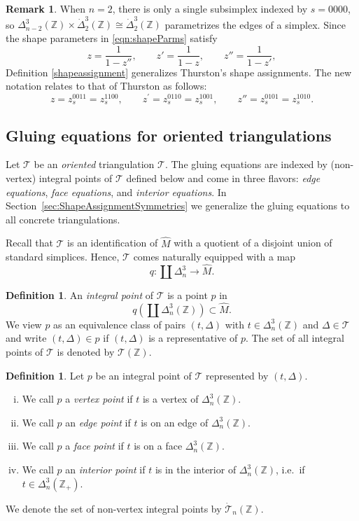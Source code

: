 \documentclass[12pt]{amsart}
\theoremstyle{definition}
\newtheorem{definition}[theorem]{Definition}
\newtheorem{remark}[theorem]{Remark}
\numberwithin{equation}{section}
\def\Z{\mathbb{Z}}
\def\T{\mathcal{T}}
\begin{document}
\begin{remark}When $n=2$, there is only a single subsimplex indexed by $s=0000$, so $\Delta^3_{n-2}(\Z)\times\dot{\Delta}^3_2(\Z)\cong \dot{\Delta}^3_2(\Z)$ parametrizes the edges of a simplex. Since the shape parameters in \eqref{eqn:shapeParms} satisfy $$z=\frac{1}{1-z''},\qquad z'=\frac{1}{1-z},\qquad z''=\frac{1}{1-z'},$$  Definition \ref{shapeassignment} generalizes Thurston's shape assignments. The new notation relates to that of Thurston as follows:
$$z=z_s^{0011}=z_s^{1100},\qquad z^\prime=z_s^{0110}=z_s^{1001}, \qquad z''=z_s^{0101}=z_s^{1010}.$$
\end{remark}

\subsection{Gluing equations for oriented triangulations}\label{sec:GluingEquations}

Let $\T$ be an \emph{oriented} triangulation $\mathcal{T}$. The gluing equations are indexed by (non-vertex) integral points of $\mathcal{T}$ defined below and come in three flavors: \emph{edge equations}, \emph{face equations}, and \emph{interior equations}. In Section~\ref{sec:ShapeAssignmentSymmetries} we generalize the gluing equations to all concrete triangulations.

Recall that $\mathcal{T}$ is an identification of $\widehat{M}$ with a quotient of a disjoint union of standard simplices. Hence, $\mathcal{T}$ comes naturally equipped with a map
\begin{equation}
q\colon \coprod\Delta^3_n \rightarrow \widehat{M}.
\end{equation}


\begin{definition}\label{def:IntegralPoint}
An \emph{integral point} of $\mathcal{T}$ is a point $p$ in  
$$q\left(\coprod\Delta^3_n(\Z)\right)\subset \widehat{M}.$$
We view $p$ as an equivalence class of pairs $(t,\Delta)$ with $t\in\Delta^3_n(\Z)$ and $\Delta\in\mathcal T$ and write $(t,\Delta)\in p$ if $(t,\Delta)$ is a representative of $p$. The set of all integral points of $\mathcal{T}$ is denoted by $\mathcal{T}(\Z)$.
\end{definition}

\begin{definition} Let $p$ be an integral point of $\mathcal T$ represented by $(t,\Delta)$.
\begin{enumerate}[(i)]
\item We call $p$ a \emph{vertex point} if $t$ is a vertex of $\Delta^3_n(\Z)$.
\item We call $p$ an \emph{edge point} if $t$ is on an edge of $\Delta^3_n(\Z)$.
\item We call $p$ a \emph{face point} if $t$ is on a face $\Delta^3_n(\Z)$.
\item We call $p$ an \emph{interior point} if $t$ is in the interior of $\Delta^3_n(\Z)$, i.e.~if $t\in\Delta_n^3(\Z_+)$.
\end{enumerate}
We denote the set of non-vertex integral points by $\dot{\mathcal T}_n(\Z)$.
\end{definition}
\end{document}
